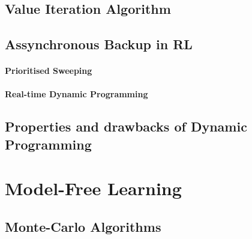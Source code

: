 	\subsection{Value Iteration Algorithm} %
		\label{sub:value_iteration_algorithm}
	

	\subsection{Assynchronous Backup in RL} %
		\label{sub:assynchronous_backup_in_rl}
		
		\paragraph{Prioritised Sweeping} %
			\label{par:prioritised_sweeping}
		

		\paragraph{Real-time Dynamic Programming} %
			\label{par:real_time_dynamic_programming}
		

	
	\subsection{Properties and drawbacks of Dynamic Programming} %
		\label{sub:properties_and_drawbacks_of_dynamic_programming}
	


\section{Model-Free Learning} %
	\label{sec:model_free_learning}

	\subsection{Monte-Carlo Algorithms} %
		\label{sub:monte_carlo_algorithm}

